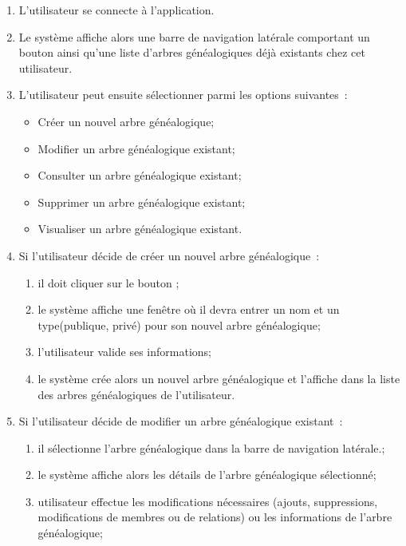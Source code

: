 \begin{enumerate}

  \item  L’utilisateur se connecte à l’application.

  \item Le système affiche alors une barre de navigation latérale comportant un
    bouton  ainsi qu’une liste d’arbres généalogiques déjà
    existants chez cet utilisateur.

  \item L’utilisateur peut ensuite sélectionner parmi les options suivantes :
    \begin{itemize}
      \item Créer un nouvel arbre généalogique;
      \item Modifier un arbre généalogique existant;
      \item Consulter un arbre généalogique existant;
      \item Supprimer un arbre généalogique existant;
      \item Visualiser un arbre généalogique existant.
    \end{itemize}

  \item Si l’utilisateur décide de créer un nouvel arbre généalogique :
    \begin{enumerate}
      \item il doit cliquer sur le bouton ;
      \item le système affiche une fenêtre où il devra entrer un nom et un type(publique, privé)
        pour son nouvel arbre généalogique;
      \item l’utilisateur valide ses informations;
      \item le système crée alors un nouvel arbre généalogique et l’affiche dans la liste des arbres
        généalogiques de l’utilisateur.
    \end{enumerate}

  \item  Si l’utilisateur décide de modifier un arbre généalogique existant :
    \begin{enumerate}
      \item il sélectionne l’arbre généalogique dans la barre de navigation latérale.;
      \item le système affiche alors les détails de l’arbre généalogique sélectionné;
      \item utilisateur effectue les modifications nécessaires (ajouts,
        suppressions, modifications de membres ou de relations) ou les
        informations de l’arbre généalogique;


\end{enumerate}
\end{enumerate}
